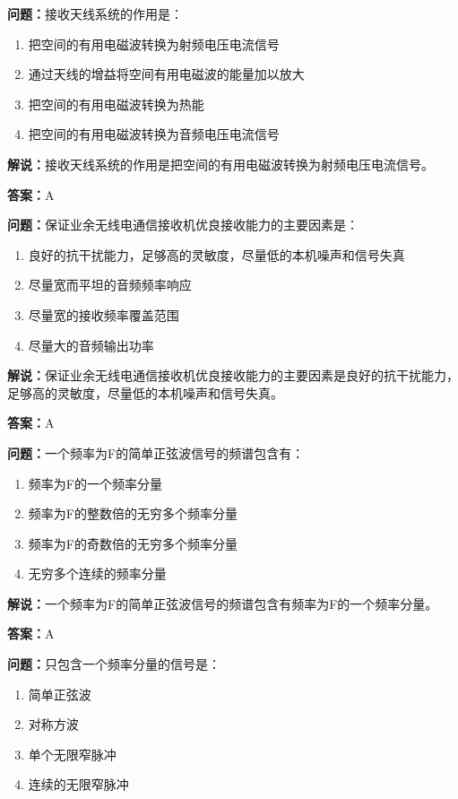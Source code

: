 \documentclass[UTF8]{ctexbook}
\begin{document}
\textbf{问题：}接收天线系统的作用是：

\begin{enumerate}[label=\Alph*), leftmargin=3em]
  \item 把空间的有用电磁波转换为射频电压电流信号
  \item 通过天线的增益将空间有用电磁波的能量加以放大
  \item 把空间的有用电磁波转换为热能
  \item 把空间的有用电磁波转换为音频电压电流信号
\end{enumerate}

\textbf{解说：}接收天线系统的作用是把空间的有用电磁波转换为射频电压电流信号。%

\textbf{答案：}A

\textbf{问题：}保证业余无线电通信接收机优良接收能力的主要因素是：

\begin{enumerate}[label=\Alph*), leftmargin=3em]
  \item 良好的抗干扰能力，足够高的灵敏度，尽量低的本机噪声和信号失真
  \item 尽量宽而平坦的音频频率响应
  \item 尽量宽的接收频率覆盖范围
  \item 尽量大的音频输出功率
\end{enumerate}

\textbf{解说：}保证业余无线电通信接收机优良接收能力的主要因素是良好的抗干扰能力，足够高的灵敏度，尽量低的本机噪声和信号失真。%

\textbf{答案：}A

\textbf{问题：}一个频率为F的简单正弦波信号的频谱包含有：

\begin{enumerate}[label=\Alph*), leftmargin=3em]
  \item 频率为F的一个频率分量
  \item 频率为F的整数倍的无穷多个频率分量
  \item 频率为F的奇数倍的无穷多个频率分量
  \item 无穷多个连续的频率分量
\end{enumerate}

\textbf{解说：}一个频率为F的简单正弦波信号的频谱包含有频率为F的一个频率分量。%

\textbf{答案：}A

\textbf{问题：}只包含一个频率分量的信号是：
\begin{enumerate}[label=\Alph*), leftmargin=3em]
  \item 简单正弦波
  \item 对称方波
  \item 单个无限窄脉冲
  \item 连续的无限窄脉冲
\end{enumerate}
\end{document}
